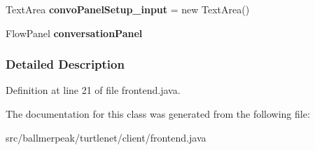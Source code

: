 \begin{DoxyCompactItemize}
\item 
\hypertarget{classballmerpeak_1_1turtlenet_1_1client_1_1frontend_a5f2d5e5cab0462b9bd2b2c05d412606d}{Text\-Area {\bfseries convo\-Panel\-Setup\-\_\-input} = new Text\-Area()}\label{classballmerpeak_1_1turtlenet_1_1client_1_1frontend_a5f2d5e5cab0462b9bd2b2c05d412606d}

\item 
\hypertarget{classballmerpeak_1_1turtlenet_1_1client_1_1frontend_a98647f4c02d7c216346e1b4dd3ca499d}{Flow\-Panel {\bfseries conversation\-Panel}}\label{classballmerpeak_1_1turtlenet_1_1client_1_1frontend_a98647f4c02d7c216346e1b4dd3ca499d}

\end{DoxyCompactItemize}


\subsubsection{Detailed Description}


Definition at line 21 of file frontend.\-java.



The documentation for this class was generated from the following file\-:\begin{DoxyCompactItemize}
\item 
src/ballmerpeak/turtlenet/client/frontend.\-java\end{DoxyCompactItemize}
